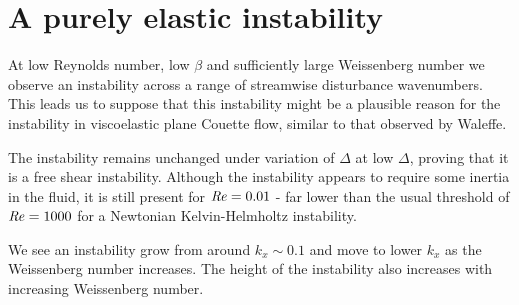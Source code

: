 \documentclass{jfm}
\newcommand\Rey{\mbox{\textit{Re}}}  %
\begin{document}
\section{A purely elastic instability}

At low Reynolds number, low $\beta$ and sufficiently large Weissenberg number we observe an instability across a range of streamwise disturbance wavenumbers. This leads us to suppose that this instability might be a plausible reason for the instability in viscoelastic plane Couette flow, similar to that observed by Waleffe.

The instability remains unchanged under variation of $\Delta$ at low $\Delta$, proving that it is a free shear instability. Although the instability appears to require some inertia in the fluid, it is still present for  $\Rey = 0.01$  - far lower than the usual threshold of $\Rey = 1000$ for a Newtonian Kelvin-Helmholtz instability.

We see an instability grow from around $k_x \sim 0.1$ and move to lower $k_x$ as the Weissenberg number increases. The height of the instability also increases with increasing Weissenberg number. 
\end{document}
